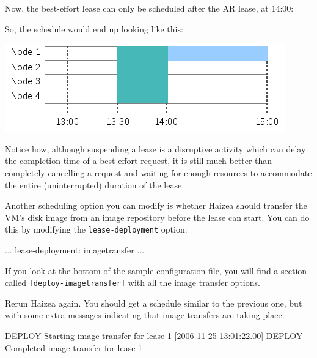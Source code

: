 Now, the best-effort lease can only be scheduled after the AR lease, at 14:00:


So, the schedule would end up looking like this:

\begin{center}
\includegraphics{images/quickstart_leasegraph4.png}
\end{center}

Notice how, although suspending a lease is a disruptive activity which can delay the completion time of a best-effort request, it is still much better than completely cancelling a request and waiting for enough resources to accommodate the entire (uninterrupted) duration of the lease.

Another scheduling option you can modify is whether Haizea should transfer the VM's disk image from an image repository before the lease can start. You can do this by modifying the \texttt{lease-deployment} option:

\begin{wideshellverbatim}
[general]
...
lease-deployment: imagetransfer
...
\end{wideshellverbatim}

If you look at the bottom of the sample configuration file, you will find a section called \texttt{[deploy-imagetransfer]} with all the image transfer options.

Rerun Haizea again. You should get a schedule similar to the previous one, but with some extra messages indicating that image transfers are taking place:

\begin{wideshellverbatim}
[2006-11-25 13:00:00.00] DEPLOY  Starting image transfer for lease 1
[2006-11-25 13:01:22.00] DEPLOY  Completed image transfer for lease 1
\end{wideshellverbatim}

